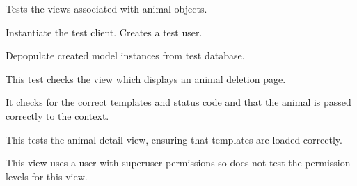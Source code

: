 \documentclass[letterpaper,10pt,english]{sphinxmanual}
\begin{document}
\begin{fulllineitems}
\label{animals:mousedb.animal.tests.AnimalViewTests}
Tests the views associated with animal objects.

\begin{fulllineitems}
\label{animals:mousedb.animal.tests.AnimalViewTests.setUp}
Instantiate the test client.  Creates a test user.

\end{fulllineitems}


\begin{fulllineitems}
\label{animals:mousedb.animal.tests.AnimalViewTests.tearDown}
Depopulate created model instances from test database.

\end{fulllineitems}


\begin{fulllineitems}
\label{animals:mousedb.animal.tests.AnimalViewTests.test_animal_delete}
This test checks the view which displays an animal deletion page.

It checks for the correct templates and status code and that the animal is passed correctly to the context.

\end{fulllineitems}


\begin{fulllineitems}
\label{animals:mousedb.animal.tests.AnimalViewTests.test_animal_detail}
This tests the animal-detail view, ensuring that templates are loaded correctly.

This view uses a user with superuser permissions so does not test the permission levels for this view.

\end{fulllineitems}


\end{fulllineitems}
\end{document}

